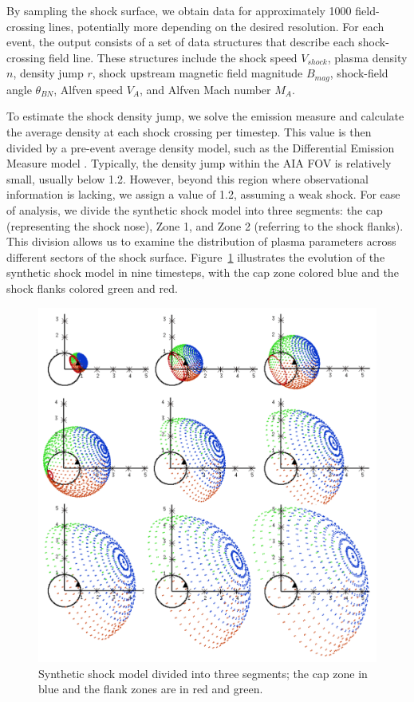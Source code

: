 By sampling the shock surface, we obtain data for approximately 1000 field-crossing lines, potentially more depending on the desired resolution. For each event, the output consists of a set of data structures that describe each shock-crossing field line. These structures include the shock speed $V_{shock}$, plasma density $n$, density jump $r$, shock upstream magnetic field magnitude $B_{mag}$, shock-field angle $\theta_{BN}$, Alfven speed $V_A$, and Alfven Mach number $M_A$.

To estimate the shock density jump, we solve the emission measure and calculate the average density at each shock crossing per timestep. This value is then divided by a pre-event average density model, such as the Differential Emission Measure model \cite[DEM]{cheung_2015}. Typically, the density jump within the AIA FOV is relatively small, usually below 1.2. However, beyond this region where observational information is lacking, we assign a value of 1.2, assuming a weak shock.
For ease of analysis, we divide the synthetic shock model into three segments: the cap (representing the shock nose), Zone 1, and Zone 2 (referring to the shock flanks). This division allows us to examine the distribution of plasma parameters across different sectors of the shock surface. Figure~\ref{fig_segments} illustrates the evolution of the synthetic shock model in nine timesteps, with the cap zone colored blue and the shock flanks colored green and red.

\begin{figure}[!htp] %
	\centerline{\includegraphics[width=0.7\columnwidth]{chapter2/figs/fig_s2m_segments_geometry.png}}
	\caption{Synthetic shock model divided into three segments; the cap zone in blue and the flank zones are in red and green.}
	\label{fig_segments}
\end{figure}

